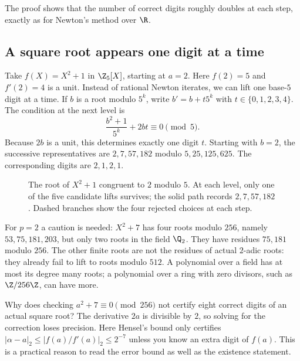 The proof shows that the number of correct digits roughly doubles at each step, exactly as for Newton's method over $\R$.

\subsection*{A square root appears one digit at a time}
Take $f(X)=X^2+1$ in $\Z_5[X]$, starting at $a=2$. Here $f(2)=5$ and
$f'(2)=4$ is a unit. Instead of rational Newton iterates, we can lift one
base-$5$ digit at a time. If $b$ is a root modulo $5^k$, write
$b'=b+t5^k$ with $t\in\{0,1,2,3,4\}$. The condition at the next level is
\[
\frac{b^2+1}{5^k}+2bt\equiv0\pmod5.
\]
Because $2b$ is a unit, this determines exactly one digit $t$. Starting with
$b=2$, the successive representatives are $2,7,57,182$ modulo
$5,25,125,625$. The corresponding digits are $2,1,2,1$.

\begin{figure}[ht]
\centering{}
\caption{The root of $X^2+1$ congruent to $2$ modulo $5$. At each level,
only one of the five candidate lifts survives; the solid path records
$2,7,57,182$. Dashed branches show the four rejected choices at each step.}
\label{fig:hensel-lifting}
\end{figure}

For $p=2$ a caution is needed: $X^2+7$ has four roots modulo $256$, namely
$53,75,181,203$, but only two roots in the field $\Q_2$. They have residues
$75,181$ modulo $256$. The other finite roots are not the residues of actual
$2$-adic roots: they already fail to lift to roots modulo $512$.
A polynomial over a field has at most its degree many roots; a polynomial
over a ring with zero divisors, such as $\Z/256\Z$, can have more.

\begin{think}
Why does checking $a^2+7\equiv0\pmod{256}$ not certify eight correct digits
of an actual square root? The derivative $2a$ is divisible by $2$, so solving
for the correction loses precision. Here Hensel's bound only certifies
$|\alpha-a|_2\le|f(a)/f'(a)|_2\le2^{-7}$ unless you know an extra digit
of $f(a)$. This is a practical reason to read the error bound as well as the
existence statement.
\end{think}

